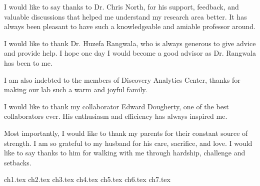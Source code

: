 \documentclass[12pt,dvips]{report}
\begin{document}
I would like to say thanks to Dr. Chris North, for his support, feedback, and valuable discussions that helped me understand my research area better. It has always been pleasant to have such a knowledgeable and amiable professor around.

I would like to thank Dr. Huzefa Rangwala, who is always generous to give advice and provide help. I hope one day I would become a good advisor as Dr. Rangwala has been to me.

I am also indebted to the members of Discovery Analytics Center, thanks for making our lab such a warm and joyful family.

I would like to thank my collaborator Edward Dougherty, one of the best collaborators ever. His enthusiasm and efficiency has always inspired me.

Most importantly, I would like to thank my parents for their constant source of strength. I am so grateful to my husband for his care, sacrifice, and love. I would like to say thanks to him for walking with me through hardship, challenge and setbacks.



\tableofcontents
\pagebreak

\listoffigures
\pagebreak

\listoftables
\pagebreak

\pagestyle{myheadings}

{ch1.tex}%
{ch2.tex}%
{ch3.tex}%
{ch4.tex}%
{ch5.tex}%
{ch6.tex}%
{ch7.tex}%



%





\end{document}
